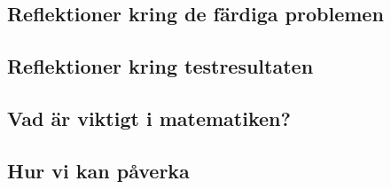 \documentclass[11pt,a4paper]{article}
\begin{document}
    \subsection{Reflektioner kring de färdiga problemen}
        

    \subsection{Reflektioner kring testresultaten}
        
    
    
%        
    
        
    \subsection{Vad är viktigt i matematiken?}
        \label{sec:VadArViktigt}
        
        
    \subsection{Hur vi kan påverka}
        
    
\end{document}
